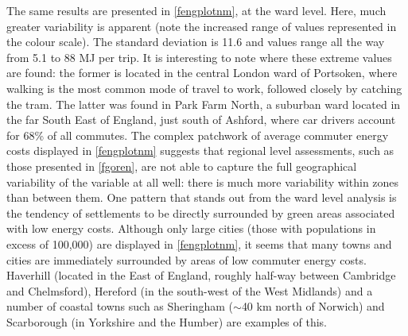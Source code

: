 \documentclass[a4paper, 11pt, twoside]{Thesis}
\begin{document}
The same results are presented in \cref{fengplotnm}, at the ward level.
Here, much greater variability is apparent (note the increased range of
values represented in the colour scale). The standard deviation is 11.6
and values range all the way from 5.1 to 88 MJ per trip.
It is interesting to note where these extreme values are found:
the former is located in the central London ward of
Portsoken, where walking is the most common mode of travel to work,
followed closely by catching the tram. The latter was
found in Park Farm North,
a suburban ward located in the far South East of England, just south of
Ashford, where car drivers account for 68\% of all commutes. The complex
patchwork of average  commuter energy costs displayed in \cref{fengplotnm}
suggests that regional level assessments, such as those
presented in \cref{fgoren}, are not able to capture the full geographical
variability of the variable at all well: there is much more variability
within zones than between them. One pattern that stands out from the ward level
analysis is the tendency of settlements to be directly surrounded by green areas
associated with low energy costs. Although only large cities (those with
populations in excess of 100,000) are displayed in
\cref{fengplotnm}, it seems that many towns and cities are immediately surrounded
by areas of low commuter energy costs. Haverhill (located in the East of
England, roughly half-way between Cambridge and Chelmsford),
Hereford (in the south-west of the West Midlands) and a number of coastal
towns such as  Sheringham ($\sim$40 km north of Norwich) and Scarborough
(in Yorkshire and the Humber) are examples of this.
\end{document}
